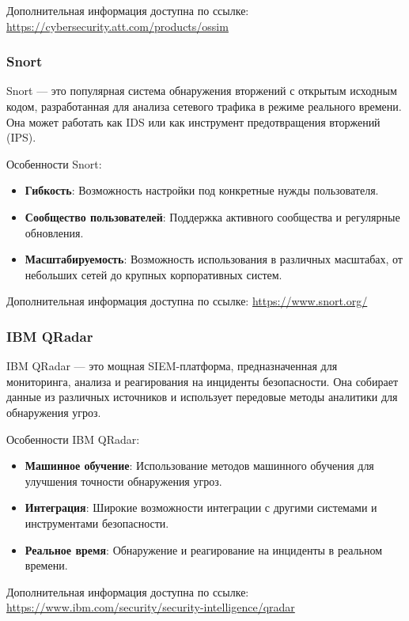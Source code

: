 Дополнительная информация доступна по ссылке: \url{https://cybersecurity.att.com/products/ossim}

\subsubsection{Snort}

Snort — это популярная система обнаружения вторжений с открытым исходным кодом, разработанная для анализа сетевого трафика в режиме реального времени. Она может работать как IDS или как инструмент предотвращения вторжений (IPS).

Особенности Snort:
\begin{itemize}
    \item \textbf{Гибкость}: Возможность настройки под конкретные нужды пользователя.
    \item \textbf{Сообщество пользователей}: Поддержка активного сообщества и регулярные обновления.
    \item \textbf{Масштабируемость}: Возможность использования в различных масштабах, от небольших сетей до крупных корпоративных систем.
\end{itemize}

Дополнительная информация доступна по ссылке: \url{https://www.snort.org/}

\subsubsection{IBM QRadar}

IBM QRadar — это мощная SIEM-платформа, предназначенная для мониторинга, анализа и реагирования на инциденты безопасности. Она собирает данные из различных источников и использует передовые методы аналитики для обнаружения угроз.

Особенности IBM QRadar:
\begin{itemize}
    \item \textbf{Машинное обучение}: Использование методов машинного обучения для улучшения точности обнаружения угроз.
    \item \textbf{Интеграция}: Широкие возможности интеграции с другими системами и инструментами безопасности.
    \item \textbf{Реальное время}: Обнаружение и реагирование на инциденты в реальном времени.
\end{itemize}

Дополнительная информация доступна по ссылке: \url{https://www.ibm.com/security/security-intelligence/qradar}


